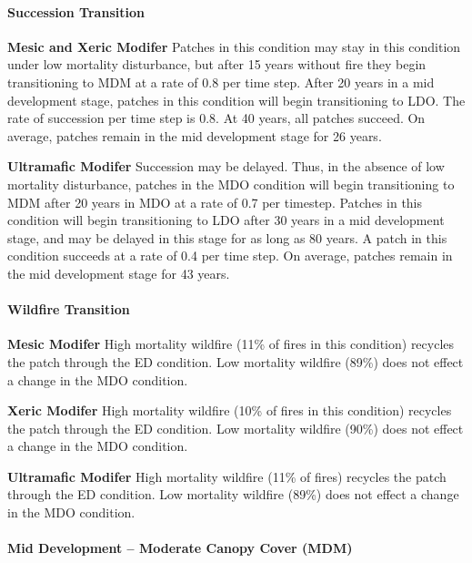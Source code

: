 \paragraph{Succession Transition}
\begin{adjustwidth}{2cm}{}
\textbf{Mesic and Xeric Modifer } Patches in this condition may stay in this condition under low mortality disturbance, but after 15 years without fire they begin transitioning to MDM at a rate of 0.8 per time step. After 20 years in a mid development stage, patches in this condition will begin transitioning to LDO. The rate of succession per time step is 0.8. At 40 years, all patches succeed. On average, patches remain in the mid development stage for 26 years.


\medskip
\noindent \textbf{Ultramafic Modifer}  Succession may be delayed. Thus, in the absence of low mortality disturbance, patches in the MDO condition will begin transitioning to MDM after 20 years in MDO at a rate of 0.7 per timestep. Patches in this condition will begin transitioning to LDO after 30 years in a mid development stage, and may be delayed in this stage for as long as 80 years. A patch in this condition succeeds at a rate of 0.4 per time step. On average, patches remain in the mid development stage for 43 years.

\end{adjustwidth}
\paragraph{Wildfire Transition}
\begin{adjustwidth}{2cm}{}
\textbf{Mesic Modifer } High mortality wildfire (11\% of fires in this condition) recycles the patch through the ED condition. Low mortality wildfire (89\%) does not effect a change in the MDO condition.


\medskip
\noindent \textbf{Xeric Modifer}  High mortality wildfire (10\% of fires in this condition) recycles the patch through the ED condition. Low mortality wildfire (90\%) does not effect a change in the MDO condition.


\medskip
\noindent \textbf{Ultramafic Modifer} High mortality wildfire (11\% of fires) recycles the patch through the ED condition. Low mortality wildfire (89\%) does not effect a change in the MDO condition.

\end{adjustwidth}

\noindent\hrulefill

\paragraph{Mid Development – Moderate Canopy Cover (MDM)}

